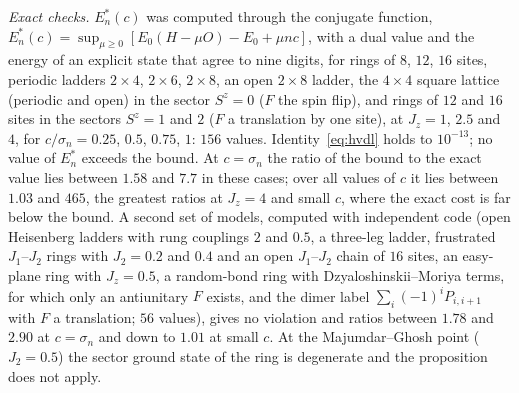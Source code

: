 \documentclass[aps,prx,onecolumn,10pt,nofootinbib,longbibliography,floatfix]{revtex4-2}
\theoremstyle{remark}
\newcommand{\Jz}{J_z}
\begin{document}
\emph{Exact checks.} $E^*_n(c)$ was computed through the conjugate function,
$E^*_n(c)=\sup_{\mu\ge0}[E_0(H-\mu O)-E_0+\mu nc]$, with a dual value and the energy of an explicit state that
agree to nine digits, for rings of $8$, $12$, $16$ sites, periodic ladders $2\times4$, $2\times6$, $2\times8$, an %
open $2\times8$ ladder, the $4\times4$ square lattice (periodic and open) in the sector $S^z=0$ ($F$ the spin %
flip), and rings of $12$ and $16$ sites in the sectors $S^z=1$ and $2$ ($F$ a translation by one site), at %
$\Jz=1$, $2.5$ and $4$, for $c/\sigma_n=0.25$, $0.5$, $0.75$, $1$: $156$ values. Identity~\eqref{eq:hvdl} holds to %
$10^{-13}$; no value of $E^*_n$ exceeds the bound. At $c=\sigma_n$ the ratio of the bound to the exact value lies %
between $1.58$ and $7.7$ in these cases; over all values of $c$ it lies between $1.03$ and $465$, the greatest %
ratios at $\Jz=4$ and small $c$, where the exact cost is far below the bound. A second set of models, computed
with independent code (open Heisenberg ladders with rung couplings $2$ and $0.5$, a three-leg ladder, frustrated %
$J_1$--$J_2$ rings with $J_2=0.2$ and $0.4$ and an open $J_1$--$J_2$ chain of $16$ sites, an easy-plane ring with %
$\Jz=0.5$, a random-bond ring with Dzyaloshinskii--Moriya terms, for which only an antiunitary $F$ exists, and %
the dimer label $\sum_i(-1)^iP_{i,i+1}$ with $F$ a translation; $56$ values), gives no violation and ratios %
between $1.78$ and $2.90$ at $c=\sigma_n$ and down to $1.01$ at small $c$. At the Majumdar--Ghosh point %
($J_2=0.5$) the sector ground state of the ring is degenerate and the proposition does not apply. %
\end{document}
